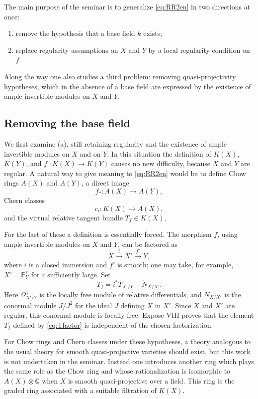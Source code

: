 \documentclass[14pt]{extarticle}
\newcommand{\QQ}{\mathbb Q}
\newcommand{\PP}{\mathbb P}
\begin{document}
The main purpose of the seminar is to generalize \eqref{eq:RR2en} in two directions at once:
\begin{enumerate}[label=(\alph*)]
\item remove the hypothesis that a base field $k$ exists;
\item replace regularity assumptions on $X$ and $Y$ by a local regularity condition on $f$.
\end{enumerate}
Along the way one also studies a third problem: removing quasi-projectivity hypotheses, which in the absence of a base field are expressed by the existence of ample invertible modules on $X$ and $Y$.

\subsection{Removing the base field}

We first examine (a), still retaining regularity and the existence of ample invertible modules on $X$ and on $Y$. In this situation the definition of $K(X)$, $K(Y)$, and $f_!:K(X)\to K(Y)$ causes no new difficulty, because $X$ and $Y$ are regular. A natural way to give meaning to \eqref{eq:RR2en} would be to define Chow rings $A(X)$ and $A(Y)$, a direct image
\[
   f_*:A(X)\to A(Y),
\]
Chern classes
\[
   c_i:K(X)\to A(X),
\]
and the virtual relative tangent bundle $T_f\in K(X)$.

For the last of these a definition is essentially forced. The morphism $f$, using ample invertible modules on $X$ and $Y$, can be factored as
\begin{equation}\label{eq:factor}
   X\xrightarrow{i}X'\xrightarrow{f'}Y,
\end{equation}
where $i$ is a closed immersion and $f'$ is smooth; one may take, for example, $X'=\PP^r_Y$ for $r$ sufficiently large. Set
\begin{equation}\label{eq:Tfactor}
   T_f=i^*T_{X'/Y}-\check N_{X/X'}.
\end{equation}
Here $\Omega^1_{X'/Y}$ is the locally free module of relative differentials, and $N_{X/X'}$ is the conormal module $J/J^2$ for the ideal $J$ defining $X$ in $X'$. Since $X$ and $X'$ are regular, this conormal module is locally free. Expose VIII proves that the element $T_f$ defined by \eqref{eq:Tfactor} is independent of the chosen factorization.

For Chow rings and Chern classes under these hypotheses, a theory analogous to the usual theory for smooth quasi-projective varieties should exist, but this work is not undertaken in the seminar. Instead one introduces another ring which plays the same role as the Chow ring and whose rationalization is isomorphic to $A(X)\otimes\QQ$ when $X$ is smooth quasi-projective over a field. This ring is the graded ring associated with a suitable filtration of $K(X)$.
\end{document}
